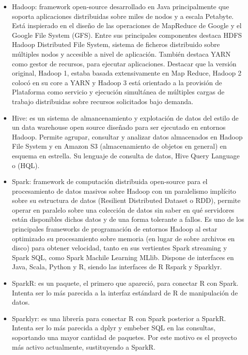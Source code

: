 \documentclass[]{book}
\begin{document}
\begin{itemize}
\item
  Hadoop: framework open-source desarrollado en Java principalmente que
  soporta aplicaciones distribuidas sobre miles de nodos y a escala
  Petabyte. Está inspierado en el diseño de las operaciones de MapReduce
  de Google y el Google File System (GFS). Entre sus principales
  componentes destaca HDFS Hadoop Distributed File System, sistema de
  ficheros distribuido sobre múltiples nodos y accesible a nivel de
  aplicación. También destaca YARN como gestor de recursos, para
  ejecutar aplicaciones. Destacar que la versión original, Hadoop 1,
  estaba basada extensivamente en Map Reduce, Hadoop 2 colocó en su core
  a YARN y Hadoop 3 está orientado a la provisión de Plataforma como
  servicio y ejecución simultánea de múltiples cargas de trabajo
  distribuidas sobre recursos solicitados bajo demanda.
\item
  Hive: es un sistema de almancenamiento y explotación de datos del
  estilo de un data warehouse open source diseñado para ser ejecutado en
  entornos Hadoop. Permite agrupar, consultar y analizar datos
  almacenados en Hadoop File System y en Amazon S3 (almacenamiento de
  objetos en general) en esquema en estrella. Su lenguaje de consulta de
  datos, Hive Query Language o (HQL).
\item
  Spark: framework de computación distribuida open-source para el
  procesamiento de datos masivos sobre Hadoop con un paralelismo
  implícito sobre su estructura de datos (Resilient Distributed Dataset
  o RDD), permite operar en paralelo sobre una colección de datos sin
  saber en qué servidores están disponibles dichos datos y de una forma
  tolerante a fallos. Es uno de los principales frameworks de
  programación de entornos Hadoop al estar optimizado su procesamiento
  sobre memoria (en lugar de sobre archivos en disco) para obtener
  velocidad, tanto en sus vertientes Spark streaming y Spark SQL, como
  Spark Machile Learning MLlib. Dispone de interfaces en Java, Scala,
  Python y R, siendo las interfaces de R Rspark y Sparklyr.
\item
  SparkR: es un paquete, el primero que apareció, para conectar R con
  Spark. Intenta ser lo más parecida a la interfaz estándard de R de
  manipulación de datos.
\item
  Sparklyr: es una librería para conectar R con Spark posterior a
  SparkR. Intenta ser lo más parecida a dplyr y embeber SQL en las
  consultas, soportando una mayor cantidad de paquetes. Por este motivo
  es el proyecto más activo actualmente, sustituyendo a SparkR.
\end{itemize}
\end{document}
